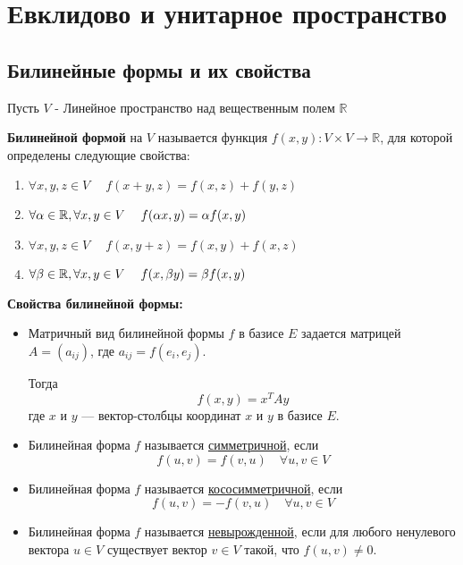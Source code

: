 \chapter{Евклидово и унитарное пространство}

\section{Билинейные формы и их свойства}

\large Пусть $V$ - Линейное пространство над вещественным полем $\mathbb{R}$

\vspace{0.5cm}


\begin{shdef}
    \begin{definition}
        \leavevmode\newline
        
        \textbf{Билинейной формой} на $V$ называется функция $f(x,y): V \times V \to \mathbb{R}$, для которой определены следующие свойства:
        \begin{enumerate}
            \item $\forall x,y,z \in V \quad \; f(x+y,z) = f(x, z) + f(y,z)$
            \item $\forall \alpha \in \mathbb{R}, \forall x,y \in V \quad \;  f(\alpha x, y) = \alpha f(x,y)$
            \item $\forall x, y, z \in V \quad \; f(x,y + z) = f(x,y) + f(x,z)$
            \item $\forall \beta \in \mathbb{R}, \forall x, y \in V \quad \; f(x, \beta y) = \beta f(x,y)$
        \end{enumerate}
    \end{definition}
\end{shdef}

\vspace{0.5cm}
\textbf{Свойства билинейной формы:}

\begin{itemize}
    \item Матричный вид билинейной формы $f$ в базисе $E$ задается матрицей $A = (a_{ij})$, где $a_{ij} = f(e_i, e_j)$. 

    Тогда
    \[
    f(x, y) = x^T A y
    \]
    где $x$ и $y$ — вектор-столбцы координат $x$ и $y$ в базисе $E$.
    \item Билинейная форма $f$ называется \underline{симметричной}, если
    \[
    f(u, v) = f(v, u) \quad \forall u, v \in V
    \]
    \item Билинейная форма $f$ называется \underline{кососимметричной}, если
    \[
    f(u, v) = -f(v, u) \quad \forall u, v \in V
    \]
    \item Билинейная форма $f$ называется \underline{невырожденной}, если для любого \newline ненулевого вектора $u \in V$ существует вектор $v \in V$ такой, что $f(u, v) \neq 0$.
\end{itemize}

